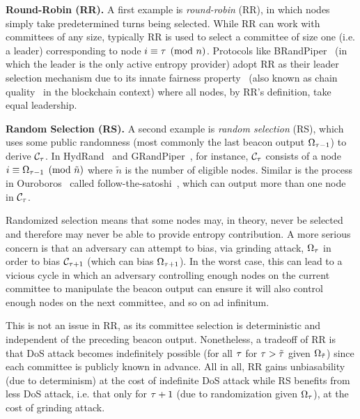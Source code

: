 \noindent\textbf{Round-Robin (RR).} A first example is \textit{round-robin} (RR), in which nodes simply take predetermined turns being selected. While RR can work with committees of any size, typically RR is used to select a committee of size one (i.e. a leader) corresponding to node $i \equiv \tau \pmod n$. Protocols like BRandPiper~\cite{bhat2020randpiper} (in which the \epoch leader is the only active entropy provider) adopt RR as their leader selection mechanism due to its innate fairness property~\cite{azouvi2018winning} (also known as chain quality~\cite{garay2015bitcoin} in the blockchain context) where all nodes, by RR's definition, take equal leadership.

\noindent\textbf{Random Selection (RS).} A second example is \textit{random selection} (RS), which uses some public randomness (most commonly the last beacon output $\Omega_{\tau - 1}$) to derive $\mathcal{C}_\tau$.
In HydRand~\cite{schindler2020hydrand} and GRandPiper~\cite{bhat2020randpiper}, for instance, $\mathcal{C}_\tau$ consists of a node $i \equiv \Omega_{\tau - 1} \pmod{\tilde{n}}$ where $\tilde{n}$ is the number of eligible nodes. Similar is the process in Ouroboros~\cite{kiayias2017ouroboros} called follow-the-satoshi~\cite{bentov2014proof,kiayias2017ouroboros}, which can output more than one node in $\mathcal{C}_\tau$.

Randomized selection means that some nodes may, in theory, never be selected and therefore may never be able to provide entropy contribution. A more serious concern is that an adversary can attempt to bias, via grinding attack, $\Omega_\tau$ in order to bias $\mathcal{C}_{\tau + 1}$ (which can bias $\Omega_{\tau + 1}$). In the worst case, this can lead to a vicious cycle in which an adversary controlling enough nodes on the current committee to manipulate the beacon output can ensure it will also control enough nodes on the next committee, and so on ad infinitum.

This is not an issue in RR, as its committee selection is deterministic and independent of the preceding beacon output. Nonetheless, a tradeoff of RR is that DoS attack becomes indefinitely possible (for all \epochs $\tau$ for $\tau > \tilde{\tau}$ given $\Omega_{\tilde{\tau}}$) since each committee is publicly known in advance. All in all, RR gains unbiasability (due to determinism) at the cost of indefinite DoS attack while RS benefits from less DoS attack, i.e. that only for \epoch $\tau + 1$ (due to randomization given $\Omega_\tau$), at the cost of grinding attack.

